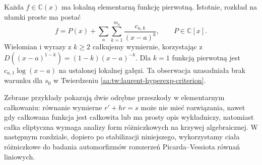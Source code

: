 \begin{przyklad}
\label{aa:prz:rational-primitive}
Każda $f\in\mathbb C(x)$
ma lokalną elementarną
funkcję pierwotną.
Istotnie, rozkład
na ułamki proste ma postać
\[
 f=P(x)+\sum_a\sum_{k=1}^{m_a}
     \frac{c_{a,k}}{(x-a)^k},
 \qquad P\in\mathbb C[x].
\]
Wielomian i wyrazy z $k\ge2$
całkujemy wymiernie, korzystając
z $D((x-a)^{1-k})=(1-k)(x-a)^{-k}$.
Dla $k=1$ funkcją pierwotną
jest $c_{a,1}\log(x-a)$
na ustalonej lokalnej gałęzi.
Ta obserwacja uzasadniała
brak warunku dla $s_0$
w Twierdzeniu
\ref{aa:tw:laurent-hyperexp-criterion}.
\end{przyklad}

Zebrane przykłady pokazują
dwie odrębne przeszkody
w elementarnym całkowaniu:
równanie wymierne
$r'+hr=s$ może nie mieć
rozwiązania, nawet gdy
całkowana funkcja jest
całkowita lub ma prosty
opis wykładniczy,
natomiast całka eliptyczna
wymaga analizy form
różniczkowych na
krzywej algebraicznej.
W następnym rozdziale,
dopiero po stabilizacji
niniejszego, wykorzystamy
ciała różniczkowe do
badania automorfizmów
rozszerzeń Picarda--Vessiota
równań liniowych.
